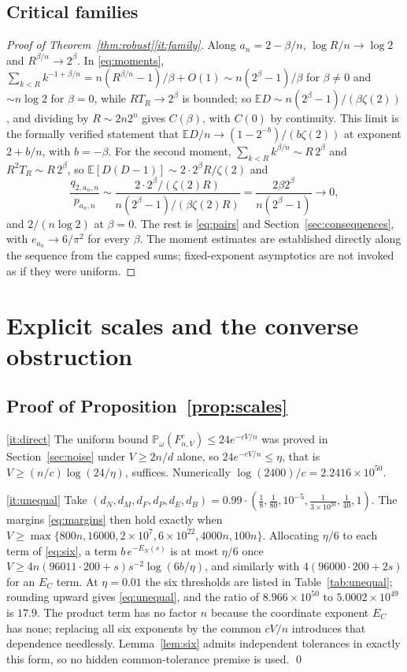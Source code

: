 \documentclass[11pt,letterpaper]{article}
\theoremstyle{plain}
\theoremstyle{definition}
\theoremstyle{remark}
\numberwithin{equation}{section}
\newcommand{\PP}{\mathbb P}
\newcommand{\EE}{\mathbb E}
\begin{document}
\subsection{Critical families}
\begin{proof}[Proof of Theorem~\ref{thm:robust}\ref{it:family}]
Along $a_n=2-\beta/n$, $\log R/n\to\log2$ and $R^{\beta/n}\to2^\beta$. In \eqref{eq:moments}, $\sum_{k<R}k^{-1+\beta/n}=n(R^{\beta/n}-1)/\beta+O(1)\sim n(2^\beta-1)/\beta$ for $\beta\ne0$ and $\sim n\log2$ for $\beta=0$, while $RT_R\to2^\beta$ is bounded; so $\EE D\sim n(2^\beta-1)/(\beta\zeta(2))$, and dividing by $R\sim2n2^n$ gives $C(\beta)$, with $C(0)$ by continuity. This limit is the formally verified statement that $\EE D/n\to(1-2^{-b})/(b\zeta(2))$ at exponent $2+b/n$, with $b=-\beta$. For the second moment, $\sum_{k<R}k^{\beta/n}\sim R\,2^\beta$ and $R^2T_R\sim R\,2^\beta$, so $\EE[D(D-1)]\sim2\cdot2^\beta R/\zeta(2)$ and
\[
 \frac{q_{2,a_n,n}}{p_{a_n,n}}\sim\frac{2\cdot2^\beta/(\zeta(2)R)}{n(2^\beta-1)/(\beta\zeta(2)R)}=\frac{2\beta2^\beta}{n(2^\beta-1)}\to0,
\]
and $2/(n\log2)$ at $\beta=0$. The rest is \eqref{eq:pairs} and Section~\ref{sec:consequences}, with $e_{a_n}\to6/\pi^2$ for every $\beta$. The moment estimates are established directly along the sequence from the capped sums; fixed-exponent asymptotics are not invoked as if they were uniform.
\end{proof}

\section{Explicit scales and the converse obstruction}\label{sec:scales}

\subsection{Proof of Proposition~\ref{prop:scales}}
\ref{it:direct} The uniform bound $\PP_\omega(F_{n,V}^c)\le24e^{-cV/n}$ was proved in Section~\ref{sec:noise} under $V\ge2n/d$ alone, so $24e^{-cV/n}\le\eta$, that is $V\ge(n/c)\log(24/\eta)$, suffices. Numerically $\log(2400)/c=2.2416\times10^{50}$.

\ref{it:unequal} Take $(d_N,d_M,d_F,d_P,d_E,d_B)=0.99\cdot(\tfrac18,\tfrac1{80},10^{-5},\tfrac1{3\times10^{20}},\tfrac1{40},1)$. The margins \eqref{eq:margins} then hold exactly when $V\ge\max\{800n,16000,2\times10^7,6\times10^{22},4000n,100n\}$. Allocating $\eta/6$ to each term of \eqref{eq:six}, a term $b\,e^{-E_N(s)}$ is at most $\eta/6$ once $V\ge4n(96011\cdot200+s)s^{-2}\log(6b/\eta)$, and similarly with $4(96000\cdot200+2s)$ for an $E_C$ term. At $\eta=0.01$ the six thresholds are listed in Table~\ref{tab:unequal}; rounding upward gives \eqref{eq:unequal}, and the ratio of $8.966\times10^{50}$ to $5.0002\times10^{49}$ is $17.9$. The product term has no factor $n$ because the coordinate exponent $E_C$ has none; replacing all six exponents by the common $cV/n$ introduces that dependence needlessly. Lemma~\ref{lem:six} admits independent tolerances in exactly this form, so no hidden common-tolerance premise is used. \qed
\end{document}
